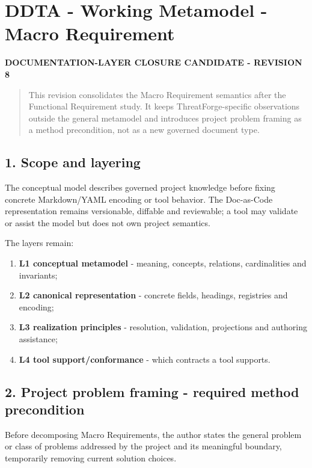 \documentclass[
  10pt,
]{article}
\author{}
\date{}
\providecommand{\tightlist}{%
  \setlength{\itemsep}{0pt}\setlength{\parskip}{0pt}}
\begin{document}
\section{DDTA - Working Metamodel - Macro
Requirement}\label{ddta---working-metamodel---macro-requirement}

\textbf{DOCUMENTATION-LAYER CLOSURE CANDIDATE - REVISION 8}

\begin{quote}
This revision consolidates the Macro Requirement semantics after the
Functional Requirement study. It keeps ThreatForge-specific observations
outside the general metamodel and introduces project problem framing as
a method precondition, not as a new governed document type.
\end{quote}

\subsection{1. Scope and layering}\label{1-scope-and-layering}

The conceptual model describes governed project knowledge before fixing
concrete Markdown/YAML encoding or tool behavior. The Doc-as-Code
representation remains versionable, diffable and reviewable; a tool may
validate or assist the model but does not own project semantics.

The layers remain:

\begin{enumerate}
\def\labelenumi{\arabic{enumi}.}
\tightlist
\item
  \textbf{L1 conceptual metamodel} - meaning, concepts, relations,
  cardinalities and invariants;
\item
  \textbf{L2 canonical representation} - concrete fields, headings,
  registries and encoding;
\item
  \textbf{L3 realization principles} - resolution, validation,
  projections and authoring assistance;
\item
  \textbf{L4 tool support/conformance} - which contracts a tool
  supports.
\end{enumerate}

\subsection{2. Project problem framing - required method
precondition}\label{2-project-problem-framing---required-method-precondition}

Before decomposing Macro Requirements, the author states the general
problem or class of problems addressed by the project and its meaningful
boundary, temporarily removing current solution choices.
\end{document}
